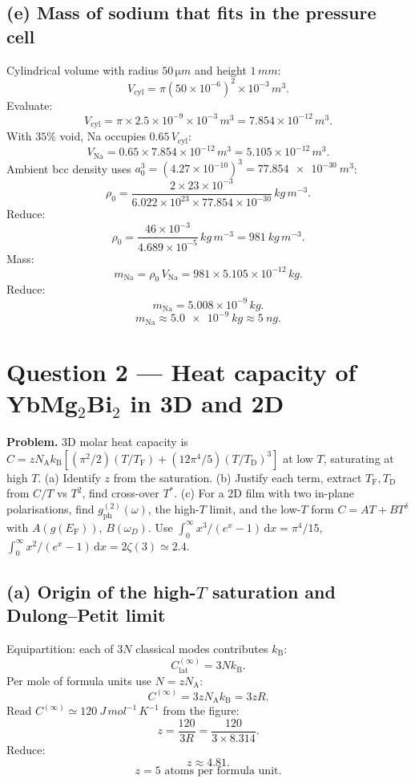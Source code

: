 \documentclass[11pt]{article}
\newcommand{\de}{\mathrm{d}}
\newcommand{\kB}{k_{\mathrm{B}}}
\newcommand{\NA}{N_{\mathrm{A}}}
\newcommand{\TF}{T_{\mathrm{F}}}
\newcommand{\TD}{T_{\mathrm{D}}}
\newcommand{\EF}{E_{\mathrm{F}}}
\begin{document}
\subsection*{(e) Mass of sodium that fits in the pressure cell}

Cylindrical volume with radius $50\,\si{\micro m}$ and height $1\,\si{mm}$:
\[
V_{\mathrm{cyl}} = \pi(50\times 10^{-6})^2\times 10^{-3}\,\si{m^3}.
\]
Evaluate:
\[
V_{\mathrm{cyl}} = \pi\times 2.5\times 10^{-9}\times 10^{-3}\,\si{m^3} = 7.854\times 10^{-12}\,\si{m^3}.
\]
With $35\%$ void, Na occupies $0.65\,V_{\mathrm{cyl}}$:
\[
V_{\mathrm{Na}} = 0.65\times 7.854\times 10^{-12}\,\si{m^3} = 5.105\times 10^{-12}\,\si{m^3}.
\]
Ambient bcc density uses $a_0^3=(4.27\times 10^{-10})^3 = \SI{77.854e-30}{m^3}$:
\[
\rho_0 = \frac{2\times 23\times 10^{-3}}{6.022\times 10^{23}\times 77.854\times 10^{-30}}\,\si{kg\,m^{-3}}.
\]
Reduce:
\[
\rho_0 = \frac{46\times 10^{-3}}{4.689\times 10^{-5}}\,\si{kg\,m^{-3}} = \SI{981}{kg\,m^{-3}}.
\]
Mass:
\[
m_{\mathrm{Na}} = \rho_0\,V_{\mathrm{Na}} = 981\times 5.105\times 10^{-12}\,\si{kg}.
\]
Reduce:
\[
m_{\mathrm{Na}} = 5.008\times 10^{-9}\,\si{kg}.
\]
\begin{equation}
\boxed{\ m_{\mathrm{Na}} \approx \SI{5.0e-9}{kg} \approx \SI{5}{ng}.\ }
\label{eq:massbox}
\end{equation}

\section*{Question 2 --- Heat capacity of YbMg$_2$Bi$_2$ in 3D and 2D}

\textbf{Problem.} 3D molar heat capacity is $C=z\NA\kB[(\pi^2/2)(T/\TF)+(12\pi^4/5)(T/\TD)^3]$ at low $T$, saturating at high $T$. (a) Identify $z$ from the saturation. (b) Justify each term, extract $\TF,\TD$ from $C/T$ vs $T^2$, find cross-over $T^\ast$. (c) For a 2D film with two in-plane polarisations, find $g_{\mathrm{ph}}^{(2)}(\omega)$, the high-$T$ limit, and the low-$T$ form $C=AT+BT^\delta$ with $A(g(\EF))$, $B(\omega_D)$. Use $\int_0^\infty x^3/(e^x-1)\,\de x=\pi^4/15$, $\int_0^\infty x^2/(e^x-1)\,\de x=2\zeta(3)\simeq 2.4$.

\subsection*{(a) Origin of the high-$T$ saturation and Dulong--Petit limit}

Equipartition: each of $3N$ classical modes contributes $\kB$:
\[
C_{\mathrm{lat}}^{(\infty)} = 3N\kB.
\]
Per mole of formula units use $N=z\NA$:
\[
C^{(\infty)} = 3z\NA\kB = 3zR.
\]
Read $C^{(\infty)}\simeq \SI{120}{J\,mol^{-1}\,K^{-1}}$ from the figure:
\[
z = \frac{120}{3R} = \frac{120}{3\times 8.314}.
\]
Reduce:
\[
z \approx 4.81.
\]
\begin{equation}
\boxed{\ z=5\text{ atoms per formula unit.}\ }
\label{eq:zbox}
\end{equation}
\end{document}
